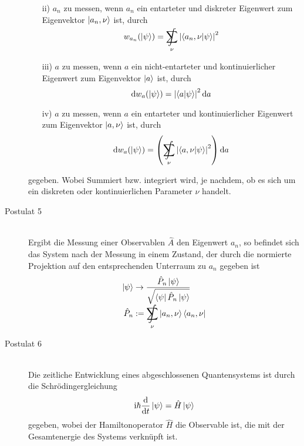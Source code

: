 \begin{description}
\begin{itemize}
					\item[ii)] $a_n$ zu messen, wenn $a_n$ ein entarteter und diskreter Eigenwert zum Eigenvektor $\Ket{a_n,\nu}$ ist, durch
					\begin{equation}
						w_{a_n}(\Ket{\psi}) = \SumInt_\nu \left|\braket{a_n ,\nu|\psi}\right|^2
					\end{equation}
					\item[iii)] $a$ zu messen, wenn $a$ ein nicht-entarteter und kontinuierlicher Eigenwert zum Eigenvektor $\Ket{a}$ ist, durch
					\begin{equation}
						\mathrm{d} w_a(\Ket{\psi}) = \left| \braket{a|\psi} \right|^2 \mathrm{d} a
					\end{equation}
					\item[iv)] $a$ zu messen, wenn $a$ ein entarteter und kontinuierlicher Eigenwert zum Eigenvektor $\Ket{a, \nu}$ ist, durch
					\begin{equation}
						\diff w_a(\Ket{\psi}) = \left( \SumInt_\nu \left| \braket{a,\nu |\psi} \right|^2 \right) \diff a
					\end{equation}
				\end{itemize}
				gegeben. Wobei Summiert bzw. integriert wird, je nachdem, ob es sich um ein diskreten oder kontinuierlichen Parameter $\nu$ handelt.
			\item[Postulat 5]\hfill \\
				Ergibt die Messung einer Observablen $\hat{A}$ den Eigenwert $a_n$, so befindet sich das System nach der Messung in einem Zustand, der durch die normierte Projektion auf den entsprechenden Unterraum zu $a_n$ gegeben ist
				\begin{equation}
					\begin{aligned}
						\Ket{\psi} &\rightarrow \frac{\hat{P}_n\Ket{\psi}} {\sqrt{\Bra{\psi}\hat{P}_n\Ket{\psi}}} \\
						\hat{P}_n &:= \SumInt_\nu \Ket{a_n,\nu}\Bra{a_n,\nu} \\
					\end{aligned}
				\end{equation}
			\item[Postulat 6]\hfill \\
				Die zeitliche Entwicklung eines abgeschlossenen Quantensystems ist durch die Schrödingergleichung
				\begin{equation}
					\mathrm{i}\hbar\frac{\mathrm{d} }{\mathrm{d} t}\Ket{\psi} = \hat{H}\Ket{\psi}
				\end{equation}
				gegeben, wobei der Hamiltonoperator $\hat{H}$ die Observable ist, die mit der Gesamtenergie des Systems verknüpft ist.

\end{description}
